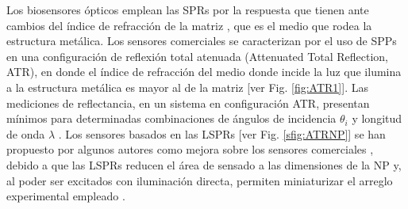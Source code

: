 Los biosensores ópticos emplean las SPRs por la respuesta que tienen ante cambios del índice de refracción de la matriz \cite{kabashin2009plasmonic}, que es el medio que rodea la estructura metálica.  Los sensores comerciales se caracterizan por el uso de SPPs \cite{estevez2014trends} en una configuración de reflexión total atenuada (Attenuated Total Reflection, ATR), en donde el índice de refracción del medio donde incide la luz que ilumina a la estructura metálica es mayor al de la matriz [ver Fig.  \ref{fig:ATR1}].  Las mediciones de reflectancia, en un sistema en configuración ATR, presentan mínimos para determinadas combinaciones de  ángulos de incidencia $\theta_i$ y longitud de onda $\lambda$  \cite{danilov2018ultra}.  Los sensores basados en las LSPRs [ver Fig. \ref{sfig:ATRNP}] se han propuesto por algunos autores como mejora sobre los sensores comerciales \cite{jain2008noble,kabashin2009plasmonic},  debido a que las LSPRs reducen el área de sensado a las dimensiones de la NP y, al poder ser excitados con iluminación directa, permiten miniaturizar el arreglo experimental empleado \cite{estevez2014trends}.



